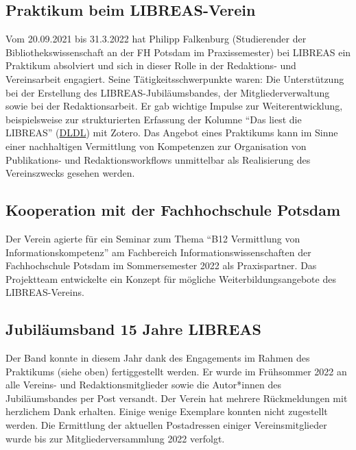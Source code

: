\documentclass[a4paper,
fontsize=11pt,
oneside,
numbers=noperiodatend,
parskip=half-,
bibliography=totoc,
final
]{scrartcl}
\begin{document}
\hypertarget{praktikum-beim-libreas-verein}{%
\subsection{Praktikum beim
LIBREAS-Verein}\label{praktikum-beim-libreas-verein}}

Vom 20.09.2021 bis 31.3.2022 hat Philipp Falkenburg (Studierender der
Bibliothekswissenschaft an der FH Potsdam im Praxissemester) bei LIBREAS
ein Praktikum absolviert und sich in dieser Rolle in der Redaktions- und
Vereinsarbeit engagiert. Seine Tätigkeitsschwerpunkte waren: Die
Unterstützung bei der Erstellung des LIBREAS-Jubiläumsbandes, der
Mitgliederverwaltung sowie bei der Redaktionsarbeit. Er gab wichtige
Impulse zur Weiterentwicklung, beispielsweise zur strukturierten
Erfassung der Kolumne \enquote{Das liest die LIBREAS}
(\href{https://www.zotero.org/groups/4620604/libreas_dldl/}{DLDL}) mit
Zotero. Das Angebot eines Praktikums kann im Sinne einer nachhaltigen
Vermittlung von Kompetenzen zur Organisation von Publikations- und
Redaktionsworkflows unmittelbar als Realisierung des Vereinszwecks
gesehen werden.

\hypertarget{kooperation-mit-der-fachhochschule-potsdam}{%
\subsection{Kooperation mit der Fachhochschule
Potsdam}\label{kooperation-mit-der-fachhochschule-potsdam}}

Der Verein agierte für ein Seminar zum Thema \enquote{B12 Vermittlung
von Informationskompetenz} am Fachbereich Informationswissenschaften der
Fachhochschule Potsdam im Sommersemester 2022 als Praxispartner. Das
Projektteam entwickelte ein Konzept für mögliche Weiterbildungsangebote
des LIBREAS-Vereins.

\hypertarget{jubiluxe4umsband-15-jahre-libreas}{%
\subsection{Jubiläumsband 15 Jahre
LIBREAS}\label{jubiluxe4umsband-15-jahre-libreas}}

Der Band konnte in diesem Jahr dank des Engagements im Rahmen des
Praktikums (siehe oben) fertiggestellt werden. Er wurde im Frühsommer
2022 an alle Vereins- und Redaktionsmitglieder sowie die Autor*innen des
Jubiläumsbandes per Post versandt. Der Verein hat mehrere Rückmeldungen
mit herzlichem Dank erhalten. Einige wenige Exemplare konnten nicht
zugestellt werden. Die Ermittlung der aktuellen Postadressen einiger
Vereinsmitglieder wurde bis zur Mitgliederversammlung 2022 verfolgt.
\end{document}
